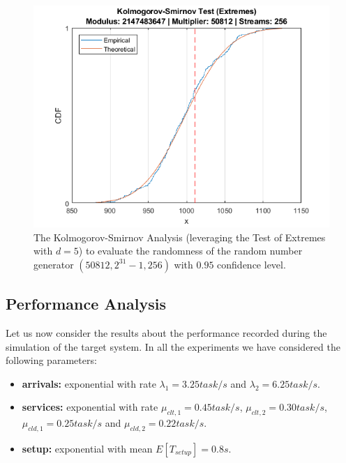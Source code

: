 \begin{figure}
	\label{fig:evaluation-randomness-kolmogorov-smirnov-50812}
	\includegraphics[width=\columnwidth]{fig/evaluation-randomness-kolmogorov-smirnov-50812}
	\caption{The Kolmogorov-Smirnov Analysis (leveraging the Test of Extremes with $d=5$) to evaluate the randomness of the random number generator $(50812,2^{31}-1, 256)$ with $0.95$ confidence level.}
\end{figure}


\subsection{Performance Analysis}
Let us now consider the results about the performance recorded during the simulation of the target system.
In all the experiments we have considered the following parameters:

\begin{itemize}
	\item \textbf{arrivals:} exponential with rate $\lambda_{1}=3.25 task/s$ and $\lambda_{2}=6.25 task/s$.
	\item \textbf{services:} exponential with rate $\mu_{clt,1} = 0.45 task/s$, $\mu_{clt,2} = 0.30 task/s$, $\mu_{cld,1} = 0.25 task/s$ and $\mu_{cld,2} = 0.22 task/s$.
	\item \textbf{setup:} exponential with mean $E[T_{setup}]=0.8s$.
\end{itemize}

